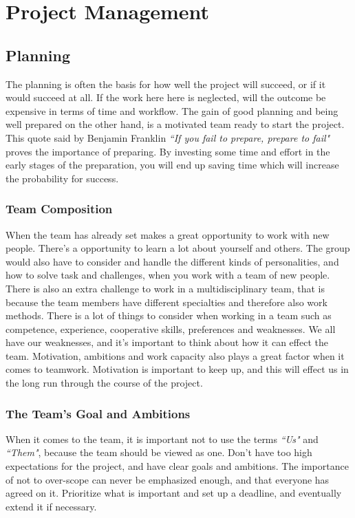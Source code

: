 \chapter{Project Management}
\label{ch:kap9}

\section{Planning}
\label{sec:planning}
The planning is often the basis for how well the project will succeed, or if it would succeed at all. If the work here here is neglected, will the outcome be expensive in terms of time and workflow. The gain of good planning and being well prepared on the other hand, is a motivated team ready to start the project. This quote said by Benjamin Franklin \textit{``If you fail to prepare, prepare to fail"} proves the importance of preparing. By investing some time and effort in the early stages of the preparation, you will end up saving time which will increase the probability for success.
\cite[P.~92]{ProjectManagement}

\subsection{Team Composition}
\label{sec:teamComp}
When the team has already set makes a great opportunity to work with new people. There's a opportunity to learn a lot about yourself and others. The group would also have to consider and handle the different kinds of personalities, and how to solve task and challenges, when you work with a team of new people. There is also an extra challenge to work in a multidisciplinary team, that is because the team members have different specialties and therefore also work methods. There is a lot of things to consider when working in a team such as competence, experience, cooperative skills, preferences and weaknesses. We all have our weaknesses, and it's important to think about how it can effect the team. Motivation, ambitions and work capacity also plays a great factor when it comes to teamwork. Motivation is important to keep up, and this will effect us in the long run through the course of the project.
\cite[P.~95-97]{ProjectManagement}

\subsection{The Team's Goal and Ambitions}
\label{sec:team}
When it comes to the team, it is important not to use the terms \textit{``Us"} and \textit{``Them"}, because the team should be viewed as one. Don't have too high expectations for the project, and have clear goals and ambitions. The importance of not to over-scope can never be emphasized enough, and that everyone has agreed on it. Prioritize what is important and set up a deadline, and eventually extend it if necessary.\cite[P.~97-109]{ProjectManagement}


